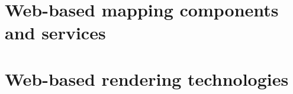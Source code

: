   \section{Web-based mapping components and services}
    \label{sec:overv:webmp}

  \section{Web-based rendering technologies}
    \label{sec:overv:webrn}






